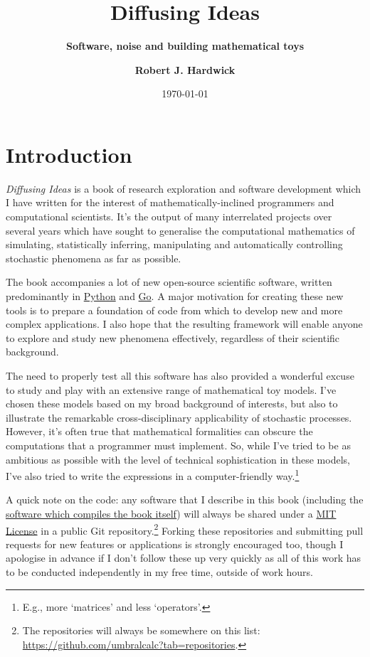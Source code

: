 \documentclass{book}
\title{\Huge \bfseries\sffamily Diffusing Ideas}
\subtitle{\Large \bfseries\sffamily \color{gray75} Software, noise and building mathematical toys}
\author{\bfseries\sffamily Robert J. Hardwick}
\date{\today}
\begin{document}
\maketitle
\frontmatter

\chapter*{Introduction}

\emph{Diffusing Ideas} is a book of research exploration and software development which I have written for the interest of mathematically-inclined programmers and computational scientists. It's the output of many interrelated projects over several years which have sought to generalise the computational mathematics of simulating, statistically inferring, manipulating and automatically controlling stochastic phenomena as far as possible. 

The book accompanies a lot of new open-source scientific software, written predominantly in \href{https://www.python.org/}{Python} and \href{https://go.dev/}{Go}. A major motivation for creating these new tools is to prepare a foundation of code from which to develop new and more complex applications. I also hope that the resulting framework will enable anyone to explore and study new phenomena effectively, regardless of their scientific background.

The need to properly test all this software has also provided a wonderful excuse to study and play with an extensive range of mathematical toy models. I've chosen these models based on my broad background of interests, but also to illustrate the remarkable cross-disciplinary applicability of stochastic processes. However, it's often true that mathematical formalities can obscure the computations that a programmer must implement. So, while I've tried to be as ambitious as possible with the level of technical sophistication in these models, I've also tried to write the expressions in a computer-friendly way.\footnote{E.g., more `matrices' and less `operators'.}

A quick note on the code: any software that I describe in this book (including the \href{https://github.com/umbralcalc/diffusing-ideas}{software which compiles the book itself}) will always be shared under a \href{https://opensource.org/licenses/MIT}{MIT License} in a public Git repository.\footnote{The repositories will always be somewhere on this list: \href{https://github.com/umbralcalc?tab=repositories}{https://github.com/umbralcalc?tab=repositories}.} Forking these repositories and submitting pull requests for new features or applications is strongly encouraged too, though I apologise in advance if I don't follow these up very quickly as all of this work has to be conducted independently in my free time, outside of work hours.
\end{document}
